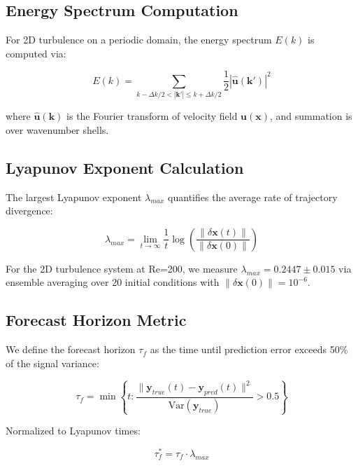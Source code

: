 \documentclass[conference]{IEEEtran}
\begin{document}
\subsection{Energy Spectrum Computation}

For 2D turbulence on a periodic domain, the energy spectrum $E(k)$ is computed via:

\begin{equation}
E(k) = \sum_{k - \Delta k/2 < |\mathbf{k}'| \leq k + \Delta k/2} \frac{1}{2}|\hat{\mathbf{u}}(\mathbf{k}')|^2
\label{eq:energy_spectrum}
\end{equation}

where $\hat{\mathbf{u}}(\mathbf{k})$ is the Fourier transform of velocity field $\mathbf{u}(\mathbf{x})$, and summation is over wavenumber shells.

\subsection{Lyapunov Exponent Calculation}

The largest Lyapunov exponent $\lambda_{max}$ quantifies the average rate of trajectory divergence:

\begin{equation}
\lambda_{max} = \lim_{t \rightarrow \infty} \frac{1}{t} \log \left( \frac{\|\delta \mathbf{x}(t)\|}{\|\delta \mathbf{x}(0)\|} \right)
\label{eq:lyapunov_definition}
\end{equation}

For the 2D turbulence system at Re=200, we measure $\lambda_{max} = 0.2447 \pm 0.015$ via ensemble averaging over 20 initial conditions with $\|\delta \mathbf{x}(0)\| = 10^{-6}$.

\subsection{Forecast Horizon Metric}

We define the forecast horizon $\tau_f$ as the time until prediction error exceeds 50\% of the signal variance:

\begin{equation}
\tau_f = \min \left\{ t : \frac{\|\mathbf{y}_{true}(t) - \mathbf{y}_{pred}(t)\|^2}{\text{Var}(\mathbf{y}_{true})} > 0.5 \right\}
\label{eq:forecast_horizon}
\end{equation}

Normalized to Lyapunov times:

\begin{equation}
\tau_f^* = \tau_f \cdot \lambda_{max}
\label{eq:normalized_forecast}
\end{equation}
\end{document}
